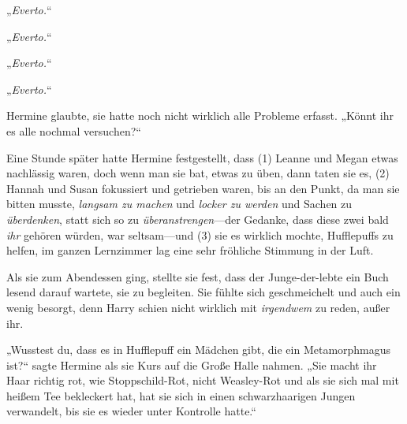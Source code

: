 „\emph{Everto.}“

„\emph{Everto.}“

„\emph{Everto.}“

„\emph{Everto.}“

Hermine glaubte, sie hatte noch nicht wirklich alle Probleme erfasst. „Könnt ihr es alle nochmal versuchen?“

Eine Stunde später hatte Hermine festgestellt, dass (1) Leanne und Megan etwas nachlässig waren, doch wenn man sie bat, etwas zu üben, dann taten sie es, (2) Hannah und Susan fokussiert und getrieben waren, bis an den Punkt, da man sie bitten musste, \emph{langsam zu machen} und \emph{locker zu werden} und Sachen zu \emph{überdenken}, statt sich so zu \emph{überanstrengen}—der Gedanke, dass diese zwei bald \emph{ihr} gehören würden, war seltsam—und (3) sie es wirklich mochte, Hufflepuffs zu helfen, im ganzen Lernzimmer lag eine sehr fröhliche Stimmung in der Luft.

Als sie zum Abendessen ging, stellte sie fest, dass der Junge-der-lebte ein Buch lesend darauf wartete, sie zu begleiten. Sie fühlte sich geschmeichelt und auch ein wenig besorgt, denn Harry schien nicht wirklich mit \emph{irgendwem} zu reden, außer ihr.

„Wusstest du, dass es in Hufflepuff ein Mädchen gibt, die ein Metamorphmagus ist?“ sagte Hermine als sie Kurs auf die Große Halle nahmen. „Sie macht ihr Haar richtig rot, wie Stoppschild-Rot, nicht Weasley-Rot und als sie sich mal mit heißem Tee bekleckert hat, hat sie sich in einen schwarzhaarigen Jungen verwandelt, bis sie es wieder unter Kontrolle hatte.“

